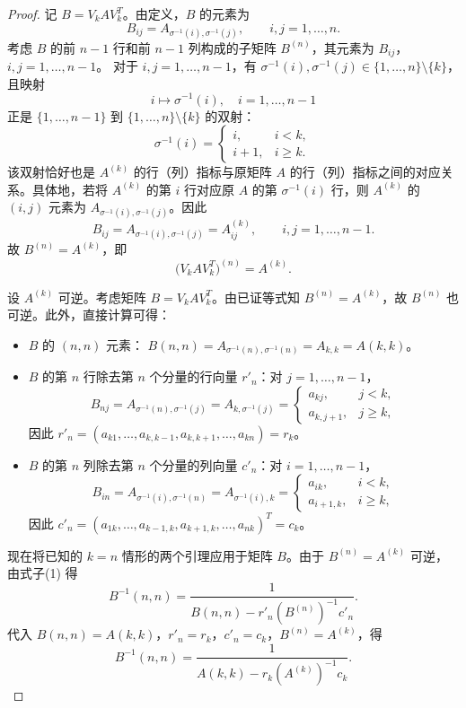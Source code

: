 \begin{proof}
记 $B = V_k A V_k^{\!T}$。由定义，$B$ 的元素为
\[
B_{ij}=A_{\sigma^{-1}(i),\sigma^{-1}(j)},\qquad i,j=1,\dots,n.
\]
考虑 $B$ 的前 $n-1$ 行和前 $n-1$ 列构成的子矩阵 $B^{(n)}$，其元素为 $B_{ij}$，$i,j=1,\dots,n-1$。
对于 $i,j=1,\dots,n-1$，有 $\sigma^{-1}(i),\sigma^{-1}(j)\in\{1,\dots,n\}\setminus\{k\}$，且映射
\[
i\mapsto \sigma^{-1}(i),\quad i=1,\dots,n-1
\]
正是 $\{1,\dots,n-1\}$ 到 $\{1,\dots,n\}\setminus\{k\}$ 的双射：
\[
\sigma^{-1}(i)=
\begin{cases}
i, & i<k, \\
i+1, & i\ge k .
\end{cases}
\]
该双射恰好也是 $A^{(k)}$ 的行（列）指标与原矩阵 $A$ 的行（列）指标之间的对应关系。具体地，若将 $A^{(k)}$ 的第 $i$ 行对应原 $A$ 的第 $\sigma^{-1}(i)$ 行，则 $A^{(k)}$ 的 $(i,j)$ 元素为 $A_{\sigma^{-1}(i),\sigma^{-1}(j)}$。因此
\[
B_{ij}=A_{\sigma^{-1}(i),\sigma^{-1}(j)}=A^{(k)}_{ij},\qquad i,j=1,\dots,n-1.
\]
故 $B^{(n)} = A^{(k)}$，即
\[
\bigl(V_k A V_k^{\!T}\bigr)^{(n)} = A^{(k)}.
\]

设 $A^{(k)}$ 可逆。考虑矩阵 $B = V_k A V_k^{\!T}$。由已证等式知 $B^{(n)} = A^{(k)}$，故 $B^{(n)}$ 也可逆。此外，直接计算可得：
\begin{itemize}
  \item $B$ 的 $(n,n)$ 元素： $B(n,n)=A_{\sigma^{-1}(n),\sigma^{-1}(n)}=A_{k,k}=A(k,k)$。
  \item $B$ 的第 $n$ 行除去第 $n$ 个分量的行向量 $r'_n$：对 $j=1,\dots,n-1$，
        \[
        B_{nj}=A_{\sigma^{-1}(n),\sigma^{-1}(j)}=A_{k,\sigma^{-1}(j)}=
        \begin{cases}
          a_{kj}, & j<k, \\
          a_{k,j+1}, & j\ge k,
        \end{cases}
        \]
        因此 $r'_n = (a_{k1},\dots,a_{k,k-1},a_{k,k+1},\dots,a_{kn}) = r_k$。
  \item $B$ 的第 $n$ 列除去第 $n$ 个分量的列向量 $c'_n$：对 $i=1,\dots,n-1$，
        \[
        B_{in}=A_{\sigma^{-1}(i),\sigma^{-1}(n)}=A_{\sigma^{-1}(i),k}=
        \begin{cases}
          a_{ik}, & i<k, \\
          a_{i+1,k}, & i\ge k,
        \end{cases}
        \]
        因此 $c'_n = (a_{1k},\dots,a_{k-1,k},a_{k+1,k},\dots,a_{nk})^{\!T} = c_k$。
\end{itemize}

现在将已知的 $k=n$ 情形的两个引理应用于矩阵 $B$。由于 $B^{(n)}=A^{(k)}$ 可逆，由式子(1) 得
\[
B^{-1}(n,n)=\frac{1}{B(n,n)-r'_n (B^{(n)})^{-1}c'_n}.
\]
代入 $B(n,n)=A(k,k)$，$r'_n=r_k$，$c'_n=c_k$，$B^{(n)}=A^{(k)}$，得
\[
B^{-1}(n,n)=\frac{1}{A(k,k)-r_k (A^{(k)})^{-1}c_k}. \tag{3}
\]


\end{proof}
